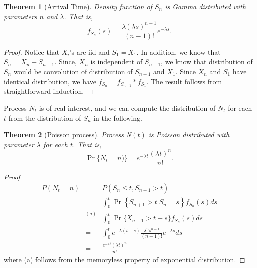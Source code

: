 \documentclass[a4paper,10pt]{article}
\theoremstyle{plain}
\newtheorem{thm}{Theorem}[section]
\theoremstyle{definition}
\begin{document}
\begin{thm}[Arrival Time] Density function of $S_n$ is Gamma distributed with parameters $n$ and $\lambda$. That is,
\begin{equation*}
f_{S_n}(s) =\frac{\lambda (\lambda s)^{n-1}} {(n-1)!} e^{-\lambda s}.
\end{equation*}
\end{thm}
\begin{proof} Notice that $X_i$'s are iid and $S_1 = X_1$. In addition, we know that $S_n = X_n + S_{n-1}$. Since, $X_n$ is independent of $S_{n-1}$, we know that distribution of $S_n$ would be convolution of distribution of $S_{n-1}$ and $X_1$. Since $X_n$ and $S_1$ have identical distribution, we have $f_{S_{n}}=f_{S_{n-1}}*f_{S_1}$. The result follows from straightforward induction.
\end{proof}

Process $N_{t}$ is of real interest, and we can compute the distribution of $N_t$ for each $t$ from the distribution of $S_n$ in the following.
\begin{thm}[Poisson process] Process $N(t)$ is Poisson distributed with parameter $\lambda$ for each $t$. That is,
	\begin{equation*}
	\Pr\{N_{t}=n)\}= e^{-\lambda t}\frac{(\lambda t)^{n}}{n!}.
	\end{equation*}
\end{thm}
\begin{proof}

\begin{eqnarray*}
   P(N_{t} =n)&=&  P(S_{n}\leq t, S_{n+1} >t)\\
   &=&  \int^{t}_{0} \Pr\left\{ {S_{n+1}>t}|{S_{n}=s}\right\}f_{S_n}(s)  ds\\
   &\stackrel{(a)}{=}& \int^{t}_{0} \Pr\{X_{n+1}>t-s\} f_{S_n}(s) ds\\
   &=&  \int^{t}_{0}e^{-\lambda(t- s)} \frac{\lambda^{n}s^{n-1}}{(n-1)!}e^{-\lambda s}  ds\\
   &=&\frac{e^{-\lambda t} (\lambda t)^{n}}{n !}.
\end{eqnarray*}
 where (a) follows from the memoryless property of exponential distribution. %
\end{proof}
\end{document}
